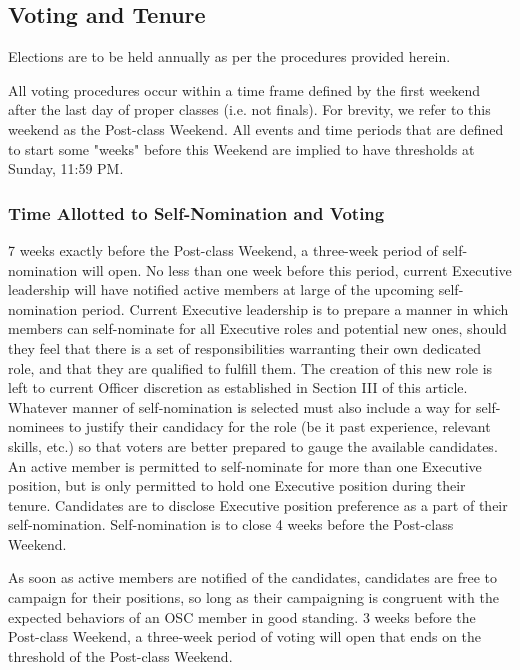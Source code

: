 \documentclass[12pt,letterpaper]{article}
\begin{document}
\subsection{Voting and Tenure}

Elections are to be held annually as per the procedures provided herein.

All voting procedures occur within a time frame defined by the first weekend after the
last day of proper classes (i.e. not finals). For brevity, we refer to this weekend as
the Post-class Weekend. All events and time periods that are defined to start some
"weeks" before this Weekend are implied to have thresholds at Sunday, 11:59 PM.

\subsubsection{Time Allotted to Self-Nomination and Voting}

7 weeks exactly before the Post-class Weekend, a three-week period of self-nomination will
open. No less than one week before this period, current Executive leadership will have
notified active members at large of the upcoming self-nomination period. Current Executive
leadership is to prepare a manner in which members can self-nominate for all Executive
roles and potential new ones, should they feel that there is a set of responsibilities
warranting their own dedicated role, and that they are qualified to fulfill them. The
creation of this new role is left to current Officer discretion as established in Section
III of this article. Whatever manner of self-nomination is selected must also include a
way for self-nominees to justify their candidacy for the role (be it past experience,
relevant skills, etc.) so that voters are better prepared to gauge the available candidates.
An active member is permitted to self-nominate for more than one Executive position, but
is only permitted to hold one Executive position during their tenure. Candidates are to
disclose Executive position preference as a part of their self-nomination. Self-nomination
is to close 4 weeks before the Post-class Weekend.

As soon as active members are notified of the candidates, candidates are free to campaign
for their positions, so long as their campaigning is congruent with the expected behaviors
of an OSC member in good standing. 3 weeks before the Post-class Weekend, a three-week
period of voting will open that ends on the threshold of the Post-class Weekend.
\end{document}
